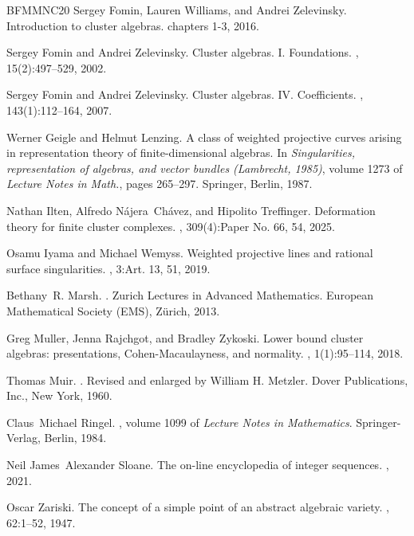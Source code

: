 \documentclass[letter,11pt]{amsart}
\theoremstyle{theorem}
\theoremstyle{definition}
\numberwithin{equation}{section}
\begin{document}
\begin{thebibliography}{BFMMNC20}
Sergey Fomin, Lauren Williams, and Andrei Zelevinsky.
\newblock Introduction to cluster algebras. chapters 1-3, 2016.

Sergey Fomin and Andrei Zelevinsky.
\newblock Cluster algebras. {I}. {F}oundations.
, 15(2):497--529, 2002.

Sergey Fomin and Andrei Zelevinsky.
\newblock Cluster algebras. {IV}. {C}oefficients.
, 143(1):112--164, 2007.

Werner Geigle and Helmut Lenzing.
\newblock A class of weighted projective curves arising in representation
  theory of finite-dimensional algebras.
\newblock In {\em Singularities, representation of algebras, and vector bundles
  ({L}ambrecht, 1985)}, volume 1273 of {\em Lecture Notes in Math.}, pages
  265--297. Springer, Berlin, 1987.

Nathan Ilten, Alfredo N\'{a}jera~Ch\'{a}vez, and Hipolito Treffinger.
\newblock Deformation theory for finite cluster complexes.
, 309(4):Paper No. 66, 54, 2025.

Osamu Iyama and Michael Wemyss.
\newblock Weighted projective lines and rational surface singularities.
, 3:Art. 13, 51, 2019.

Bethany~R. Marsh.
.
\newblock Zurich Lectures in Advanced Mathematics. European Mathematical
  Society (EMS), Z\"urich, 2013.

Greg Muller, Jenna Rajchgot, and Bradley Zykoski.
\newblock Lower bound cluster algebras: presentations, {C}ohen-{M}acaulayness,
  and normality.
, 1(1):95--114, 2018.

Thomas Muir.
.
\newblock Revised and enlarged by William H. Metzler. Dover Publications, Inc.,
  New York, 1960.

Claus~Michael Ringel.
, volume 1099 of {\em
  Lecture Notes in Mathematics}.
\newblock Springer-Verlag, Berlin, 1984.

Neil James~Alexander Sloane.
\newblock The on-line encyclopedia of integer sequences.
, 2021.

Oscar Zariski.
\newblock The concept of a simple point of an abstract algebraic variety.
, 62:1--52, 1947.

\end{thebibliography}
\end{document}

